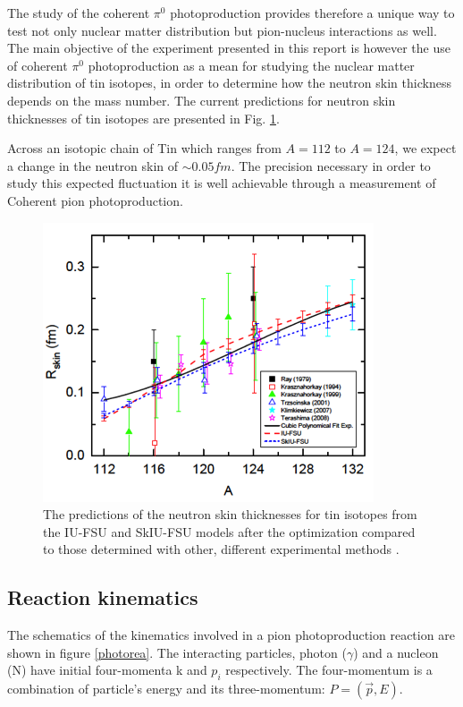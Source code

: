 \indent The study of the coherent $\pi^{0}$ photoproduction provides therefore a unique way to test not only nuclear matter distribution but pion-nucleus interactions as well. The main objective of the experiment presented in this report is however the use of coherent $\pi^{0}$ photoproduction as a mean for studying the nuclear matter distribution of tin isotopes, in order to determine how the neutron skin thickness depends on the mass number. The current predictions for neutron skin thicknesses of tin isotopes are presented in Fig. \ref{tiniso}.

\indent Across an isotopic chain of Tin which ranges from $A = 112$ to $A = 124$, we expect a change in the neutron skin of $\sim 0.05fm$. The precision necessary in order to study this expected fluctuation it is well achievable through a measurement of Coherent pion photoproduction.

\begin{figure}[H]
\begin{center}
\includegraphics[scale=0.8]{pictures/png/tiniso.png}
\caption{The predictions of the neutron skin thicknesses for tin isotopes from the IU-FSU and SkIU-FSU models after the optimization compared to those determined with other, different experimental methods \cite{fattoyev}.}
\label{tiniso}
\end{center}
\end{figure}

\subsection{Reaction kinematics}

\indent The schematics of the kinematics involved in a pion photoproduction reaction are shown in figure \ref{photorea}. The interacting particles, photon ($\gamma$) and a nucleon (N) have initial four-momenta k and $p_{i}$ respectively. The four-momentum is a combination of particle's energy and its three-momentum: $P=(\vec{p},E)$.

